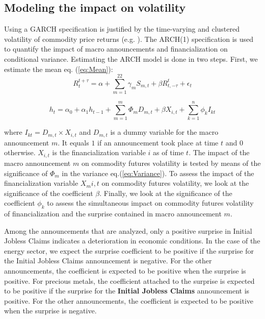 \documentclass[12pt]{article}
\begin{document}
\subsection{Modeling the impact on volatility}\label{variance}
Using a GARCH specification is justified by the time-varying and clustered volatility of commodity price returns (e.g. \citep{hammoudeh2008metal}).
The ARCH(1) specification is used to quantify the impact of macro announcements and financialization on conditional variance. Estimating the ARCH model is done in two steps. First, we estimate the mean eq. (\ref{eq:Mean}):
\begin{equation}\label{eq:Mean}R_{t}^{t+\tau}=\alpha+\sum_{m=1}^{22} \gamma_m S_{m,t}+\beta R_{t,-\tau}^{t}+\epsilon_{t}
\end{equation}


\begin{equation}\label{eq:Variance}
h_{t}=\alpha_0+\alpha_1 h_{t-1}+\sum_{m=1}^m \Phi_m D_{m,t}+\beta X_{i,t}+\sum_{k=1}^n \phi_k I_{kt}
\end{equation}

where $I_{kt}=D_{m,t} \times X_{i,t}$ and $D_{m,t}$ is a dummy variable for the macro announcement $m$. It equals $1$ if an announcement took place at time $t$ and 0 otherwise. $X_{i,t}$  is the financialization variable $i$ as of time $t$. The impact of the macro announcement $m$ on commodity futures volatility is tested by means of the significance of $\Phi_m$ in the variance eq.(\ref{eq:Variance}). To assess the impact of the financialization variable $X_m{i,t}$ on commodity futures volatility, we look at the significance of the coefficient $\beta$. Finally, we look at the significance of the coefficient $\phi_k$ to assess the simultaneous impact on commodity futures volatility of  financialization  and the surprise contained in macro announcement $m$. 

Among the announcements that are analyzed, only a positive surprise in Initial Jobless Claims indicates a deterioration in economic conditions. In the case of the energy sector, we expect the surprise coefficient to be positive if the surprise for the Initial Jobless Claims announcement is negative. For the other announcements, the coefficient is expected to be positive when the surprise is positive. For precious metals, the coefficient attached to the surprise is expected to be positive if the surprise for the \textbf{Initial Jobless Claims} announcement is positive. For the other announcements, the coefficient is expected to be positive when the surprise is negative.
\end{document}
